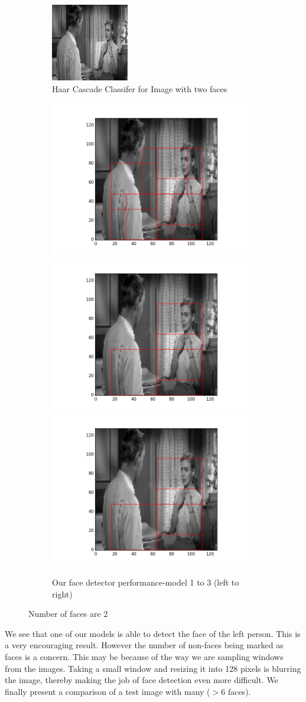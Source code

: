 \documentclass{article}
\begin{document}
\begin{figure}[h!]
  \begin{subfigure}{\linewidth}
  \centering
  \includegraphics[width=.3\linewidth]{twomodhaar.png}\hfill
  \caption{Haar Cascade Classifer for Image with two faces}
  \end{subfigure}\par\medskip
  \begin{subfigure}{\linewidth}
  \includegraphics[width=.3\linewidth]{twomod83.png}\hfill
  \includegraphics[width=.3\linewidth]{twomod91.png}\hfill
  \includegraphics[width=.3\linewidth]{twomod94.png}
  \caption{Our face detector performance-model 1 to 3 (left to right)}
  \end{subfigure}\par\medskip
  \caption{Number of faces are 2}
\end{figure}
We see that one of our models is able to detect the face of the left person. This is a very encouraging result. However the number of non-faces being marked as faces is a concern. This may be because of the way we are sampling windows from the images. Taking a small window and resizing it into 128 pixels is blurring the image, thereby making the job of face detection even more difficult. We finally present a comparison of a test image with many ($>$6 faces).
\end{document}
